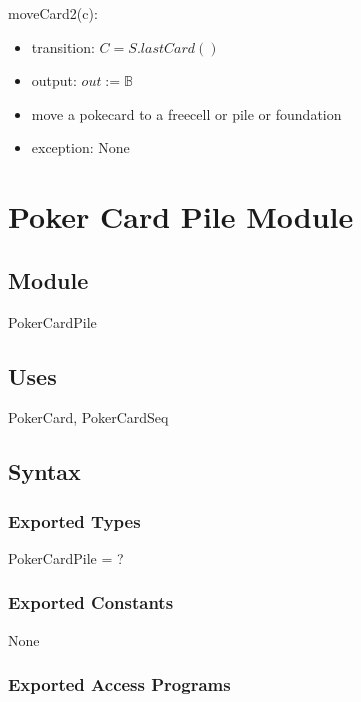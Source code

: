 \documentclass[12pt]{article}
\begin{document}
\noindent moveCard2(c):
\begin{itemize}
\item transition: $C=S.lastCard()$
\item output: $out :=  \mathbb{B}$
\item move a pokecard to a freecell or pile or foundation
\item exception: None
\end{itemize}

\newpage

\section* {Poker Card Pile Module}

\subsection* {Module}

PokerCardPile

\subsection* {Uses}

PokerCard, PokerCardSeq

\subsection* {Syntax}

\subsubsection* {Exported Types}

PokerCardPile = ?

\subsubsection* {Exported Constants}

None

\subsubsection* {Exported Access Programs}
\end{document}
